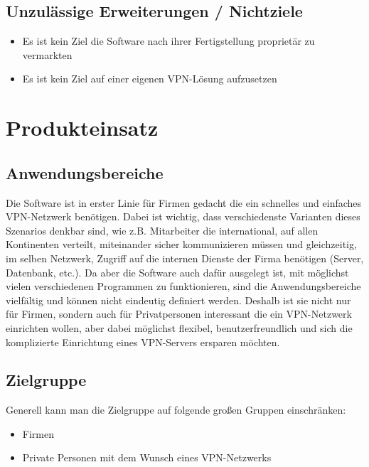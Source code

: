 \documentclass[a4paper,12pt]{scrreprt}
\begin{document}
	\section{Unzulässige Erweiterungen / Nichtziele}
	
	\begin{itemize}
	\item Es ist kein Ziel die Software nach ihrer Fertigstellung proprietär zu vermarkten
	\item Es ist kein Ziel auf einer eigenen VPN-Lösung aufzusetzen
	
	\end{itemize}
	
	
\chapter{Produkteinsatz}
	
	\section{Anwendungsbereiche}
	 Die Software ist in erster Linie für Firmen gedacht die ein schnelles und einfaches VPN-Netzwerk benötigen. Dabei ist wichtig, dass verschiedenste Varianten dieses Szenarios denkbar sind, wie z.B. Mitarbeiter die international, auf allen Kontinenten verteilt, miteinander sicher kommunizieren müssen und gleichzeitig, im selben Netzwerk, Zugriff auf die internen Dienste der Firma benötigen (Server, Datenbank, etc.). Da aber die Software auch dafür ausgelegt ist, mit möglichst vielen verschiedenen Programmen zu funktionieren, sind die Anwendungsbereiche vielfältig und können nicht eindeutig definiert werden. Deshalb ist sie nicht nur für Firmen, sondern auch für Privatpersonen interessant die ein VPN-Netzwerk einrichten wollen, aber dabei möglichst flexibel, benutzerfreundlich und sich die komplizierte Einrichtung eines VPN-Servers ersparen möchten. 
	 	
		
		
		
	\section{Zielgruppe}
	
	Generell kann man die Zielgruppe auf folgende großen Gruppen einschränken:
	\begin{itemize}
	\item Firmen
	\item Private Personen mit dem Wunsch eines VPN-Netzwerks
	\end{itemize}
	
\end{document}

